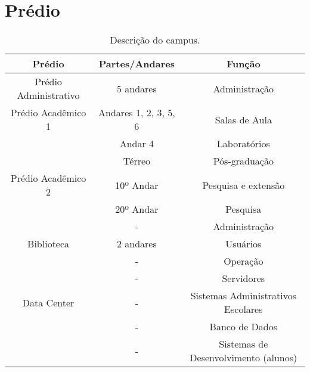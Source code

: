 \section{Prédio}

\begin{table}[H]
\centering
\begin{tabular}{ccc}
\toprule
Prédio                  & Partes/Andares                   & Função                          \\
\midrule
Prédio Administrativo  & 5 andares                       & Administração                               \\
Prédio Acadêmico 1     & Andares 1, 2, 3, 5, 6 & Salas de Aula                   \\
                       & Andar 4                         & Laboratórios                    \\
                       & Térreo                          & Pós-graduação                   \\
Prédio Acadêmico 2     & 10º Andar                       & Pesquisa e extensão             \\
                          & 20º Andar                       & Pesquisa                        \\
                          & -                               & Administração                   \\
Biblioteca             & 2 andares                       & Usuários                        \\
                          & -                               & Operação                        \\
                          & -                               & Servidores                      \\
Data Center            & -                               & Sistemas Administrativos Escolares \\
                            & -                               & Banco de Dados                  \\
                            & -                               & Sistemas de Desenvolvimento (alunos) \\
\bottomrule
\end{tabular}
\caption{Descrição do campus.}
\label{tab:campus}
\end{table}

